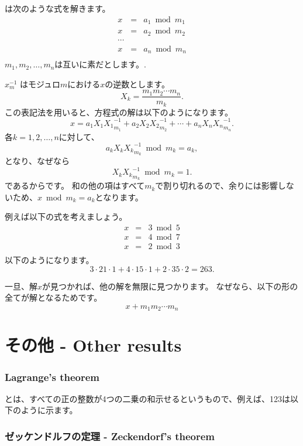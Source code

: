 
は次のような式を解きます。
\[
\begin{array}{lcl}
x & = & a_1 \bmod m_1 \\
x & = & a_2 \bmod m_2 \\
\cdots \\
x & = & a_n \bmod m_n \\
\end{array}
\]
$m_1,m_2,\ldots,m_n$は互いに素だとします。.

$x^{-1}_m$ はモジュロ$m$における$x$の逆数とします。
\[ X_k = \frac{m_1 m_2 \cdots m_n}{m_k}.\]
この表記法を用いると、方程式の解は以下のようになります。
\[x = a_1 X_1 {X_1}^{-1}_{m_1} + a_2 X_2 {X_2}^{-1}_{m_2} + \cdots + a_n X_n {X_n}^{-1}_{m_n}.\]
各$k=1,2,\ldots,n$に対して、
\[a_k X_k {X_k}^{-1}_{m_k} \bmod m_k = a_k,\]
となり、なぜなら
\[X_k {X_k}^{-1}_{m_k} \bmod m_k = 1.\]
であるからです。
和の他の項はすべて$m_k$で割り切れるので、余りには影響しないため、$x \bmod m_k = a_k$となります。

例えば以下の式を考えましょう。
\[
\begin{array}{lcl}
x & = & 3 \bmod 5 \\
x & = & 4 \bmod 7 \\
x & = & 2 \bmod 3 \\
\end{array}
\]
以下のようになります。
\[ 3 \cdot 21 \cdot 1 + 4 \cdot 15 \cdot 1 + 2 \cdot 35 \cdot 2 = 263.\]

一旦、解$x$が見つかれば、他の解を無限に見つかります。
なぜなら、以下の形の全てが解となるためです。
\[x+m_1 m_2 \cdots m_n\]

\section{その他 - Other results}

\subsubsection{Lagrange's theorem}


とは、すべての正の整数が4つの二乗の和示せるというもので、例えば、123は以下のように示ます。

\subsubsection{ゼッケンドルフの定理 - Zeckendorf's theorem}

